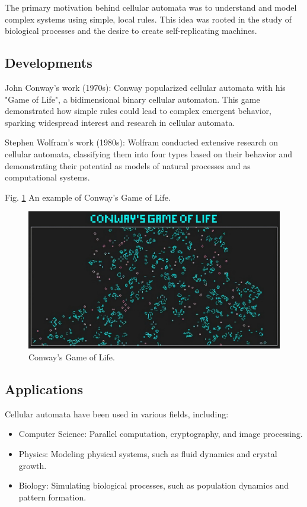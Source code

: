 \documentclass[9pt,a4paper,twoside]{tau-class/tau}
\begin{document}
    The primary motivation behind cellular automata was to understand and model complex
    systems using simple, local rules. This idea was rooted in the study of biological 
    processes and the desire to create self-replicating machines.

    \subsection{Developments}
  
    John Conway's work (1970s): Conway popularized cellular
    automata with his "Game of Life", a bidimensional binary cellular automaton. 
    This game demonstrated how simple rules could lead to complex emergent behavior, 
    sparking widespread interest and research in cellular automata.

    Stephen Wolfram's work (1980s): Wolfram conducted extensive research on cellular
    automata, classifying them into four types based on their behavior and demonstrating 
    their potential as models of natural processes and as computational systems.
  

    Fig. \ref{fig:figure} An example of Conway's Game of Life.
	\begin{figure}[H]
		\centering
		\includegraphics[width=0.75\columnwidth]{figures/gameOfLife.jpg}
		\caption{Conway's Game of Life.}
		\label{fig:figure}
	\end{figure}

    \subsection{Applications}
	
        Cellular automata have been used in various fields, including:
        
        \begin{itemize}
            \item Computer Science: Parallel computation, cryptography, and image processing.
            \item Physics: Modeling physical systems, such as fluid dynamics and crystal growth.
            \item Biology: Simulating biological processes, such as population dynamics and pattern formation.
        \end{itemize}
		
\end{document}
